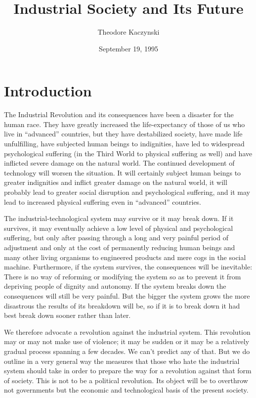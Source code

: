 \documentclass{article}
\title{Industrial Society and Its Future}
\author{Theodore Kaczynski}
\date{September 19, 1995}
\begin{document}
\maketitle
\section{Introduction}
The Industrial Revolution and its consequences have been a disaster for the human race.  They 
have  greatly  increased  the  life-expectancy  of  those  of  us  who  live  in  “advanced”  countries,  but  
they  have  destabilized  society,  have  made  life  unfulfilling,  have  subjected  human  beings  to  
indignities,  have  led  to  widespread  psychological  suffering  (in  the  Third  World  to  physical  
suffering  as  well)  and  have  inflicted  severe  damage  on  the  natural  world.   The  continued  
development  of  technology  will  worsen  the  situation.   It  will  certainly  subject  human  beings  to 
greater indignities and inflict greater damage on the natural world, it will probably lead to greater 
social disruption and psychological suffering, and it may lead to increased physical suffering even 
in “advanced” countries. 

The industrial-technological system may survive or it may break down.  If it survives, it may 
eventually  achieve  a  low  level  of  physical  and  psychological  suffering,  but  only  after  passing  
through a long and very painful period of adjustment and only at the cost of permanently reducing 
human beings and many other living organisms to engineered products and mere cogs in the social 
machine.   Furthermore,  if  the  system  survives,  the  consequences  will  be  inevitable:  There  is  no  
way of reforming or modifying the system so as to prevent it from depriving people of dignity and 
autonomy. If the system breaks down the consequences will still be very painful.  But the bigger the system 
grows the more disastrous the results of its breakdown will be, so if it is to break down it had best 
break down sooner rather than later. 

We therefore advocate a revolution against the industrial system.  This revolution may or may 
not make use of violence; it may be sudden or it may be a relatively gradual process spanning a 
few decades.  We can’t predict any of that.  But we do outline in a very general way the measures 
that those who hate the industrial system should take in order to prepare the way for a revolution 
against that form of society.  This is not to be a political revolution.  Its object will be to overthrow 
not governments but the economic and technological basis of the present society. 
\end{document}
